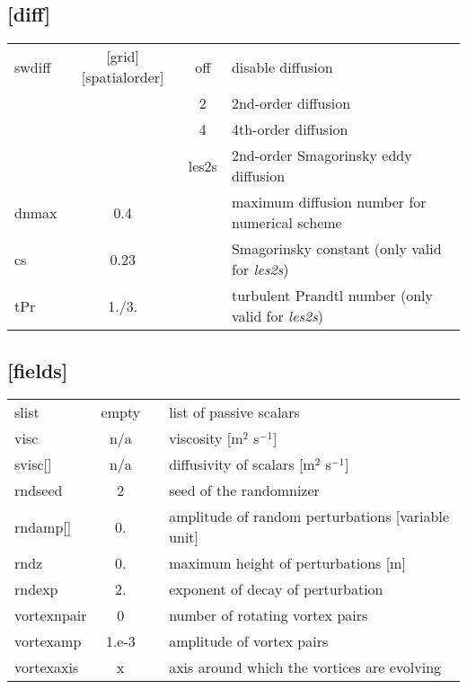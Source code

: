 \documentclass[a4paper,10pt]{extarticle}
\begin{document}
\subsection*{[diff]}
\tablelasttail{\hline}
\begin{supertabular}{lccl}
swdiff        & [grid][spatialorder] & off   & disable diffusion \\
              &                      & 2     & 2nd-order diffusion \\
              &                      & 4     & 4th-order diffusion \\
              &                      & les2s & 2nd-order Smagorinsky eddy diffusion \\
dnmax         & 0.4                  &       & maximum diffusion number for numerical scheme \\
cs            & 0.23                 &       & Smagorinsky constant (only valid for \textit{les2s}) \\
tPr           & 1./3.                &       & turbulent Prandtl number (only valid for \textit{les2s}) \\
\end{supertabular}
\subsection*{[fields]}
\tablelasttail{\hline}
\begin{supertabular}{lccl}
slist         & empty &  & list of passive scalars \\
visc          & n/a   &  & viscosity [m$^2$ s$^{-1}$] \\
svisc[]       & n/a   &  & diffusivity of scalars [m$^2$ s$^{-1}$] \\
rndseed       & 2     &  & seed of the randomnizer \\
rndamp[]      & 0.    &  & amplitude of random perturbations [variable unit] \\
rndz          & 0.    &  & maximum height of perturbations [m] \\
rndexp        & 2.    &  & exponent of decay of perturbation \\
vortexnpair   & 0     &  & number of rotating vortex pairs \\
vortexamp     & 1.e-3 &  & amplitude of vortex pairs \\
vortexaxis    & x     &  & axis around which the vortices are evolving \\
\end{supertabular}
\end{document}
